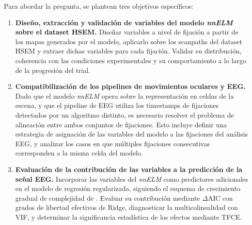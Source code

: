 \medskip
\noindent Para abordar la pregunta, se plantean tres objetivos específicos:

\begin{enumerate}

    \item \textbf{Diseño, extracción y validación de variables del modelo \textit{nnELM} sobre el dataset HSEM.}
    Diseñar variables a nivel de fijación a partir de los mapas generados por el modelo, aplicarlo sobre los scanpaths del dataset HSEM y extraer dichas variables para cada fijación. Validar su distribución, coherencia con las condiciones experimentales y su comportamiento a lo largo de la progresión del trial.

    \item \textbf{Compatibilización de los pipelines de movimientos oculares y EEG.}
    Dado que el modelo \textit{nnELM} opera sobre la representación en celdas de la escena, y que el pipeline de EEG utiliza los timestamps de fijaciones detectados por un algoritmo distinto, es necesario resolver el problema de alineación entre ambos conjuntos de fijaciones. Esto incluye definir una estrategia de asignación de las variables del modelo a las fijaciones del análisis EEG, y analizar los casos en que múltiples fijaciones consecutivas corresponden a la misma celda del modelo.

    \item \textbf{Evaluación de la contribución de las variables a la predicción de la señal EEG.}
    Incorporar las variables del \textit{nnELM} como predictores adicionales en el modelo de regresión regularizada, siguiendo el esquema de crecimiento gradual de complejidad de \citet{care2025}. Evaluar su contribución mediante $\Delta$AIC con grados de libertad efectivos de Ridge, diagnosticar la multicolinealidad con VIF, y determinar la significancia estadística de los efectos mediante TFCE.

\end{enumerate}
